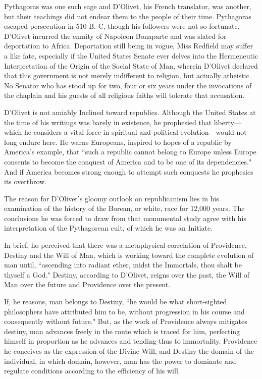 Pythagoras was one such sage and D'Olivet, his French translator, was another, but their teachings did not endear them to the people of their time. Pythagoras escaped persecution in 510 B. C, though his followers were not so fortunate. D'Olivet incurred the enmity of Napoleon Bonaparte and was slated for deportation to Africa. Deportation still being in vogue, Miss Redfield may suffer a like fate, especially if the United States Senate ever delves into the Hermeneutic Interpretation of the Origin of the Social State of Man, wherein D'Olivet declared that this government is not merely indifferent to religion, but actually atheistic. No Senator who has stood up for two, four or six years under the invocations of the chaplain and his guests of all religious faiths will tolerate that accusation.

D'Olivet is not amiably Inclined toward republics. Although the United States at the time of his writings was barely in existence, he prophesied that liberty—which he considers a vital force in spiritual and political evolution—would not long endure here. He warns Europeans, inspired to hopes of a republic by America's example, that ``such a republic cannot belong to Europe unless Europe consents to become the conquest of America and to be one of its dependencies." And if America becomes strong enough to attempt such conquests he prophesies its overthrow.

The reason for D'Olivet's gloomy outlook on republicanism lies in his examination of the history of the Borean, or white, race for 12,000 years. The conclusions he was forced to draw from that monumental study agree with his interpretation of the Pythagorean cult, of which he was an Initiate.

In brief, ho perceived that there was a metaphysical correlation of Providence, Destiny and the Will of Man, which is working toward the complete evolution of man until, ``ascending into radiant ether, midst the Immortals, thou shalt be thyself a God." Destiny, according to D'Olivet, reigns over the past, the Will of Man over the future and Providence over the present.

If, he reasons, man belongs to Destiny, ``he would be what short-sighted philosophers have attributed him to be, without progression in his course and consequently without future." But, as the work of Providence always mitigates destiny, man advances freely in the route which is traced for him, perfecting himself in proportion as he advances and tending thus to immortality. Providence he conceives as the expression of the Divine Will, and Destiny the domain of the individual, in which domain, however, man has the power to dominate and regulate conditions according to the efficiency of his will.

